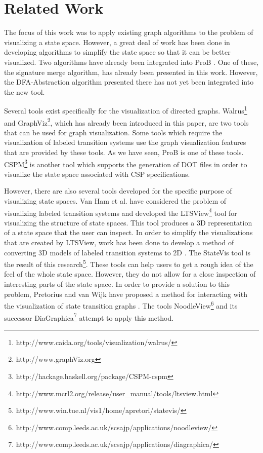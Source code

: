 \section{Related Work}

The focus of this work was to apply existing graph algorithms to the problem of visualizing a state space. However, a great deal of work has been done in developing algorithms to simplify the state space so that it can be better visualized. Two algorithms have already been integrated into ProB \cite{LeTu05_8}. One of these, the signature merge algorithm, has already been presented in this work. However, the DFA-Abstraction algorithm presented there has not yet been integrated into the new tool.

Several tools exist specifically for the visualization of directed graphs. Walrus\footnote{http://www.caida.org/tools/visualization/walrus/} and GraphViz\footnote{http://www.graphViz.org}, which has already been introduced in this paper, are two tools that can be used for graph visualization. Some tools which require the visualization of labeled transition systems use the graph visualization features that are provided by these tools. As we have seen, ProB is one of these tools. CSPM\footnote{http://hackage.haskell.org/package/CSPM-cspm} is another tool which supports the generation of DOT files in order to visualize the state space associated with CSP specifications.

However, there are also several tools developed for the specific purpose of visualizing state spaces. Van Ham et al. \cite{Ham02} have considered the problem of visualizing labeled transition systems and developed the LTSView\footnote{http://www.mcrl2.org/release/user\_manual/tools/ltsview.html} tool for visualizing the structure of state spaces. This tool produces a 3D representation of a state space that the user can inspect. In order to simplify the visualizations that are created by LTSView, work has been done to develop a method of converting 3D models of labeled transition systems to 2D \cite{Pretorius2005}. The StateVis tool is the result of this research\footnote{http://www.win.tue.nl/vis1/home/apretori/statevis/}. These tools can help users to get a rough idea of the feel of the whole state space. However, they do not allow for a close inspection of interesting parts of the state space. In order to provide a solution to this problem, Pretorius and van Wijk have proposed a method for interacting with the visualization of state transition graphs \cite{Pretorius2006}. The tools NoodleView\footnote{http://www.comp.leeds.ac.uk/scsajp/applications/noodleview/} and its successor DiaGraphica\footnote{http://www.comp.leeds.ac.uk/scsajp/applications/diagraphica/} attempt to apply this method.
